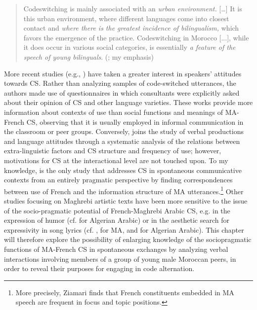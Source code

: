 \documentclass[output=paper]{langscibook}
\begin{document}
\begin{quote} 
	Codeswitching is mainly associated with an \textit{urban environment.} [\dots] It is this urban environment, where different languages come into closest contact and \textit{where there is the greatest incidence of bilingualism,} which favors the emergence of the practice. Codeswitching in Morocco [...], while it does occur in various social categories, is essentially \textit{a feature of the speech of young bilinguals}. (\citealt[276]{ziamari_development_2007}; my emphasis)
\end{quote}


More recent studies (e.g., \citealt{chakrani_sociolinguistic_2010, chakrani_work_2014, khoumssi_attitudes_2020}) have taken a greater interest in speakers’ attitudes towards \gls*{CS}. Rather than analyzing samples of code-switched utterances, the authors made use of questionnaires in which consultants were explicitly asked about their opinion of \gls*{CS} and other language varieties. These works provide more information about contexts of use than social functions and meanings of \gls*{MA}-French \gls*{CS}, observing that it is usually employed in informal communication in the classroom or peer groups. Conversely, \citet{post_impact_2015} joins the study of verbal productions and language attitudes through a systematic analysis of the relations between extra-linguistic factors and \gls*{CS} structure and frequency of use; however, motivations for \gls*{CS} at the interactional level are not touched upon. To my knowledge,  is the only study that addresses \gls*{CS} in spontaneous communicative contexts from an entirely pragmatic perspective by finding correspondences between use of French and the information structure of \gls*{MA} utterances.\footnote{More precisely, Ziamari finds that French constituents embedded in \gls*{MA} speech are frequent in focus and topic positions.} Other studies focusing on Maghrebi artistic texts have been more sensitive to the issue of the socio-pragmatic potential of French-Maghrebi Arabic \gls*{CS}, e.g. in the expression of humor (cf. \citealt{caubet_alternance_1998} for Algerian Arabic) or in the aesthetic search for expressivity in song lyrics (cf. \citealt{bentahila_language_2002}, \citealt{davies_code_2006,davies_code_2008} for \gls*{MA}, and \citealt{caubet_jeux_2002} for Algerian Arabic). This chapter will therefore explore the possibility of enlarging knowledge of the sociopragmatic functions of \gls*{MA}-French \gls*{CS} in spontaneous exchanges by analyzing verbal interactions involving members of a group of young male Moroccan peers, in order to reveal their purposes for engaging in code alternation.
\end{document}
